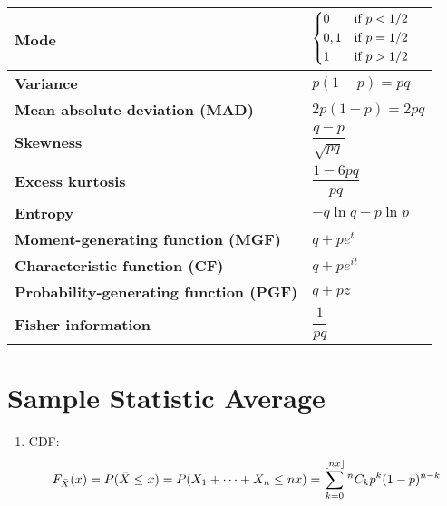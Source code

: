 \begin{customTableWrapper}{2}
\begin{longtable}{|m{6cm}|p{9cm}|}
    \textbf{Mode} & 
    ${ {\begin{dcases}0&{\text{if }}p<1/2\\0,1&{\text{if }}p=1/2\\1&{\text{if }}p>1/2\end{dcases}}}$
    \\ \hline

    \textbf{Variance} &
    ${ p(1-p)=pq}$
    \\ \hline

    \textbf{Mean absolute deviation (MAD)} &
    ${ 2p(1-p)=2pq}$
    \\[1ex] \hline

    \textbf{Skewness} &
    ${ {\dfrac {q-p}{\sqrt {pq}}}}$
    \\ \hline

    \textbf{Excess kurtosis} &
    ${ {\dfrac {1-6pq}{pq}}}$
    \\ \hline

    \textbf{Entropy} &
    ${ -q\ln q-p\ln p}$
    \\[1ex] \hline

    \textbf{Moment-generating function (MGF)} &
    ${ q+pe^{t}}$
    \\[1ex] \hline

    \textbf{Characteristic function (CF)} &
    ${ q+pe^{it}}$
    \\[1ex] \hline

    \textbf{Probability-generating function (PGF)} &
    ${ q+pz}$
    \\[1ex] \hline

    \textbf{Fisher information} &
    ${ {\dfrac {1}{pq}}}$
    \\[1ex] \hline


\end{longtable}
\end{customTableWrapper}

\section{Sample Statistic Average \cite{ism-1}} \label{Bernoulli Distribution: Sample Statistic Average}

\begin{enumerate}
    \item CDF:
    \[
        F_{\bar{X}}(x)
        = P(\bar{X} \leq x)
        = P(X_1 + \cdots + X_n \leq nx)
        = \displaystyle\sum_{k=0}^{\left \lfloor nx \right \rfloor} {^n}C_k p^k (1-p)^{n-k}
    \]

\end{enumerate}

